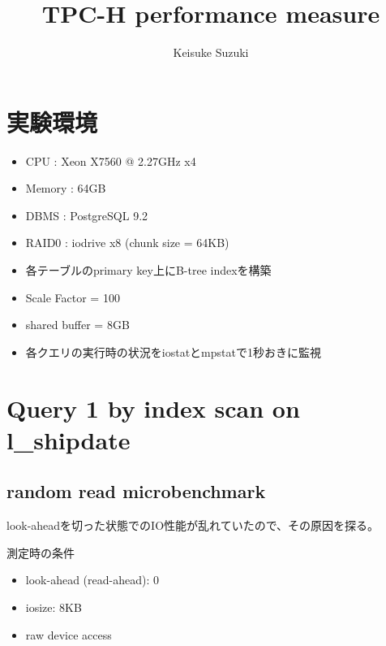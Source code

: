 \documentclass[11pt,a4paper]{jsarticle}
\title{TPC-H performance measure}
\author{Keisuke Suzuki}
\begin{document}
\maketitle
\section{実験環境}
\begin{itemize}
 \item CPU : Xeon X7560 @ 2.27GHz x4
 \item Memory : 64GB
 \item DBMS : PostgreSQL 9.2
 \item RAID0 : iodrive x8 (chunk size = 64KB)
 \item 各テーブルのprimary key上にB-tree indexを構築
 \item Scale Factor = 100
 \item shared buffer = 8GB
 \item 各クエリの実行時の状況をiostatとmpstatで1秒おきに監視
\end{itemize}

\clearpage
\section{Query 1 by index scan on l\_shipdate}
\subsection{random read microbenchmark}
look-aheadを切った状態でのIO性能が乱れていたので、その原因を探る。

測定時の条件
\begin{itemize}
 \item look-ahead (read-ahead): 0
 \item iosize: 8KB
 \item raw device access
\end{itemize}
\end{document}
